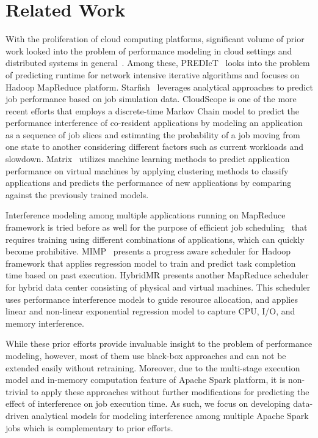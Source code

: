 \section{Related Work}
\label{related}
\noindent
With the proliferation of cloud computing platforms, significant volume of prior work looked into the problem of performance modeling in cloud settings and distributed systems in general~\cite{predict,nosqlmodel,pmodel,starfish,oltp,prepare,cloudopt,cloudscale,dbseer,amml}. 
Among these, PREDIcT~\cite{predict} looks into the problem of predicting runtime for network intensive iterative algorithms and focuses on Hadoop MapReduce platform. Starfish~\cite{starfish} leverages analytical approaches to predict job performance based on job simulation data. CloudScope \cite{chen2015cloudscope} is one of the more recent efforts that employs a discrete-time Markov Chain model to predict the performance interference of co-resident applications by modeling an application as a sequence of job slices and estimating the probability of a job moving from one state to another considering different factors such as current workloads and slowdown. Matrix~\cite{chiang2014matrix} utilizes machine learning methods to predict application performance on virtual machines by applying clustering methods to classify applications and predicts the performance of new applications by comparing against the previously trained models. 


\noindent
Interference modeling among multiple applications running on MapReduce framework is tried before as well for the purpose of efficient job scheduling~\cite{bu2013interference} that requires training using different combinations of applications, which can quickly become prohibitive. MIMP~\cite{zhangmimp} presents a progress aware scheduler for Hadoop framework that applies regression model to train and predict task completion time based on past execution. HybridMR \cite{sharma2013hybridmr} presents another MapReduce scheduler for hybrid data center consisting of physical and virtual machines. This scheduler uses performance interference models to guide resource allocation, and applies linear and non-linear exponential regression model to capture CPU, I/O, and memory interference. 


\noindent
While these prior efforts provide invaluable insight to the problem of performance modeling, however, most of them use black-box approaches and can not be extended easily without retraining. Moreover, due to the multi-stage execution model and in-memory computation feature of Apache Spark platform, it is non-trivial to apply these approaches without further modifications for predicting the effect of interference on job execution time. As such, we focus on developing data-driven analytical models for modeling interference among multiple Apache Spark jobs which is complementary to prior efforts. 


